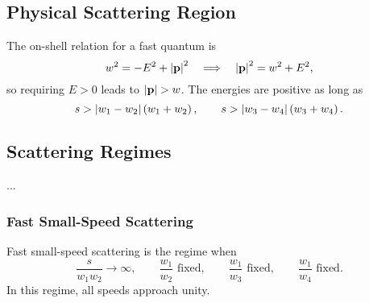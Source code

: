 \subsection{Physical Scattering Region}
The on-shell relation for a fast quantum is
\begin{equation}
	w^{2} = -E^{2} + \left\lvert \mathbf{p} \right\rvert^{2} \quad \Longrightarrow \quad \left\lvert \mathbf{p} \right\rvert^{2} = w^{2} + E^{2},
\end{equation}
so requiring $E > 0$ leads to $\left\lvert \mathbf{p} \right\rvert > w$. The energies are positive as long as
\begin{equation}
	s > \left\lvert w_{1} - w_{2} \right\rvert \left( w_{1} + w_{2} \right), \qquad s > \left\lvert w_{3} - w_{4} \right\rvert \left( w_{3} + w_{4} \right).
\end{equation}
\subsection{Scattering Regimes}
...
\subsubsection{Fast Small-Speed Scattering}
Fast small-speed scattering is the regime when
\begin{equation}
	\frac{s}{w_{1} w_{2}} \rightarrow \infty, \qquad \frac{w_{1}}{w_{2}} \text{ fixed}, \qquad \frac{w_{1}}{w_{3}} \text{ fixed}, \qquad \frac{w_{1}}{w_{4}} \text{ fixed}.
\end{equation}
In this regime, all speeds approach unity.
